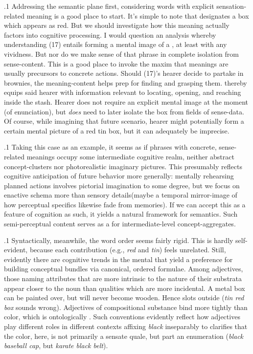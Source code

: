 \documentclass[11pt, twocolumn]{article}
\begin{document}
\p.1{%
\:\+Addressing the semantic plane first, considering words with
explicit sensation-related meaning is a good place to start. \> 
It's simple to note that  designates a box which
appears as red. \>  But we should investigate how this
meaning actually factors into cognitive processing. \>  I would
question an analysis whereby understanding \exsRef(17) entails forming a
mental image of a , at least with any
vividness. \>  But nor do we make sense of that phrase in
complete isolation from sense-content. \>  This is a good
place to invoke the maxim that meanings are usually precursors
to concrete actions. \>  Should \exsRef(17)'s hearer decide to partake in
brownies, the meaning-content helps prep for finding and grasping them. \> 
 thereby equips said hearer with
information relevant to locating, opening, and reaching inside the stash. \> 
Hearer does not require an explicit mental image at the moment
(of enunciation), but \textit{does} need to later isolate the box from
fields of sense-data. \>  Of course, while imagining that future scenario,
hearer might potentially form a certain mental picture of a red tin box,
but it can adequately be imprecise.\<\;
}%

\p.1{%
\:\+Taking this case as an example, it seems as if phrases
with concrete, sense-related meanings occupy some intermediate
cognitive realm, neither abstract concept-clusters nor
photorealistic imaginary pictures. \>  This presumably reflects
cognitive anticipation of future behavior more generally: mentally
rehearsing planned actions involves pictorial imagination to
some degree, but we focus on enactive schema more than sensory
details(maybe a temporal mirror-image of how perceptual
specifics likewise fade from memories). \> 
If we can accept this as a feature of cognition as such, it yields a
natural framework for semantics. \>  Such semi-perceptual content
serves as a  for intermediate-level concept-aggregates.\<\;
}%

\p.1{%
\:\+Syntactically, meanwhile, the word order seems fairly rigid. \>  This
is hardly self-evident, because each contribution
(e.g., \textit{red} and \textit{tin}) feels unrelated. \>  Still,
evidently there are cognitive trends in the mental
 that yield a preference for
building conceptual bundles via canonical, ordered
formulae. \>  Among adjectives, those naming attributes that are
more intrinsic to the nature of their substrata appear
closer to the noun than qualities which are more
incidental. \>  A metal box can be painted over, but will
never become wooden. \>  Hence  slots
outside  (\textit{tin red box} sounds wrong). \> 
Adjectives of compositional substance bind more
tightly than color, which is ontologically . \> 
Such conventions evidently reflect
how adjectives play different roles in different
contexts \mdash{} affixing \textit{black} inseparably to
 clarifies that the color, here, is not
primarily a sensate quale, but part
an enumeration (\textit{black baseball cap}, but
\textit{karate black belt}).\<\;
}%
\end{document}
